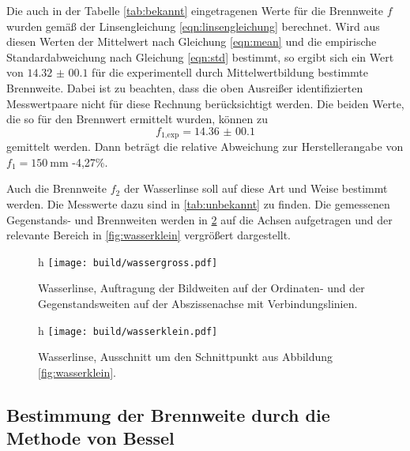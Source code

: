 Die auch in der Tabelle \ref{tab:bekannt} eingetragenen Werte für die Brennweite $f$ wurden gemäß der
Linsengleichung \eqref{eqn:linsengleichung} berechnet. Wird aus diesen Werten
der Mittelwert nach Gleichung \eqref{eqn:mean} und die empirische Standardabweichung
nach Gleichung \eqref{eqn:std} bestimmt, so ergibt sich ein Wert von $\SI{14.32(0010)}$
für die experimentell durch Mittelwertbildung bestimmte Brennweite. Dabei ist zu
beachten, dass die oben Ausreißer identifizierten Messwertpaare nicht für diese Rechnung
berücksichtigt werden. Die beiden Werte, die so für den Brennwert ermittelt wurden,
können zu
\begin{equation*}
  f_{\text{1,exp}} = \SI{14.36(0010)}
\end{equation*}
gemittelt werden. Dann beträgt die relative Abweichung zur Herstellerangabe von
$f_1 = \SI{150}{\milli\meter}$ -4,27\%.

Auch die Brennweite $f_2$ der Wasserlinse soll auf diese Art und Weise bestimmt werden.
Die Messwerte dazu sind in \ref{tab:unbekannt} zu finden.
Die gemessenen Gegenstands- und Brennweiten werden in \ref{fig:wassergross} auf die Achsen aufgetragen
und der relevante Bereich in \ref{fig:wasserklein} vergrößert dargestellt.

\begin{figure}{h}
  \centering
  \texttt{[image: build/wassergross.pdf]}
  \caption{Wasserlinse, Auftragung der Bildweiten auf der Ordinaten- und der Gegenstandsweiten auf der Abszissenachse mit Verbindungslinien.}
  \label{fig:wassergross}
\end{figure}

\begin{figure}{h}
  \centering
  \texttt{[image: build/wasserklein.pdf]}
  \caption{Wasserlinse, Ausschnitt um den Schnittpunkt aus Abbildung \ref{fig:wasserklein}.}
  \label{fig:wassergross}
\end{figure}

\subsection{Bestimmung der Brennweite durch die Methode von Bessel}

